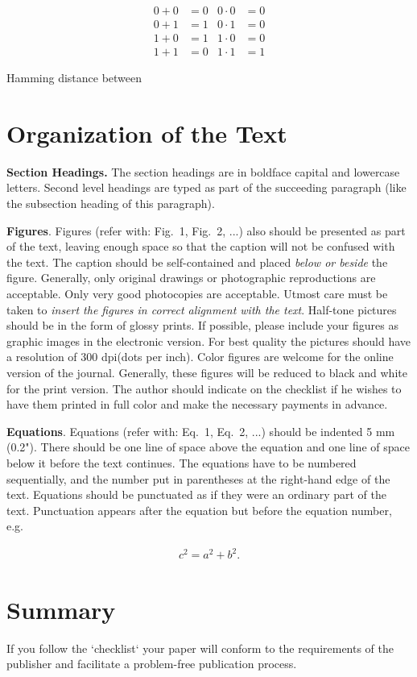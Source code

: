\documentclass{TTP_DSL2006}
\begin{document}
\begin{align*}
0 + 0 &= 0 & 0 \cdot 0 &= 0 \\
0 + 1 &= 1 & 0 \cdot 1 &= 0 \\
1 + 0 &= 1 & 1 \cdot 0 &= 0 \\
1 + 1 &= 0 & 1 \cdot 1 &= 1
\end{align*}

Hamming distance between

\section{Organization of the Text}

\noindent \textbf{Section Headings.} The section headings are in boldface capital and lowercase letters. 
Second level headings are typed as part of the succeeding paragraph (like the subsection heading of this paragraph).

\textbf{Figures}. Figures (refer with: Fig.~1, Fig.~2, ...) also should be presented as part of the text, leaving enough space so that the 
caption will not be confused with the text. The caption should be self-contained and placed \textit{below or beside }the 
figure. Generally, only original drawings or photographic reproductions are acceptable. Only very good photocopies are 
acceptable. Utmost care must be taken to \textit{insert the figures in correct alignment with the text}. Half-tone pictures
 should be in the form of glossy prints. If possible, please include your figures as graphic images in the electronic version. 
For best quality the pictures should have a resolution of 300 dpi(dots per inch).
\noindent Color figures are welcome for the online version of the journal. Generally, these figures will be reduced to black 
and white for the print version. The author should indicate on the checklist if he wishes to have them printed in full color 
and make the necessary payments in advance.

\vspace{6pt}
\textbf{Equations}.  Equations (refer with: Eq.~1, Eq.~2, ...) should be indented 5 mm (0.2"). 
There should be one line of space above the equation and one line of space below it before the text continues. 
The equations have to be numbered sequentially, and the number put in parentheses at the right-hand edge of the 
text. Equations should be punctuated as if they were an ordinary part of the text. Punctuation appears after the 
equation but before the equation number, e.g.

\begin{eqnarray}
c^2 = a^2 + b^2.
\end{eqnarray}

\section{Summary}
\noindent If you follow the `checklist` your paper will conform to the requirements
 of the publisher and facilitate a problem-free publication process.


\end{document}
